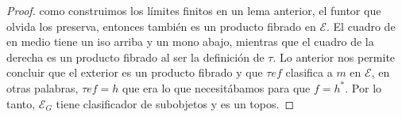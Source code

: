 \begin{proof}
como construimos los límites finitos en un lema anterior, el funtor que olvida los preserva, entonces también es un
producto fibrado en $\mathcal{E}$. El cuadro de en medio tiene un iso arriba y un mono abajo, mientras que el cuadro
de la derecha es un producto fibrado al ser la definición de $\tau$. Lo anterior nos permite concluir que el exterior
es un producto fibrado y que $\tau ef$ clasifica a $m$ en $\mathcal{E}$, en otras palabras, $\tau ef = h$ que era
lo que necesitábamos para que $f=h^*$. Por lo tanto, $\mathcal{E}_G$ tiene clasificador de subobjetos y es un topos.
\end{proof}











